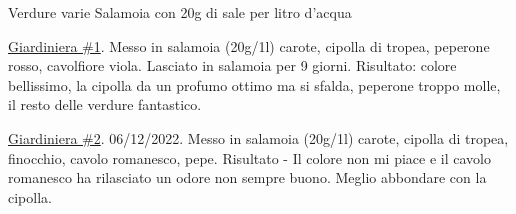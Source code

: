 \cooktime[]{-}%
\begin{ingreds}
	Verdure varie
	Salamoia con 20g di sale per litro d'acqua



\end{ingreds}

\begin{method}
\underline{Giardiniera \#1}. Messo in salamoia (20g/1l) carote, cipolla di tropea, peperone rosso, cavolfiore viola. Lasciato in salamoia per 9 giorni. Risultato: colore bellissimo, la cipolla da un profumo ottimo ma si sfalda, peperone troppo molle, il resto delle verdure fantastico.

\underline{Giardiniera \#2}. 06/12/2022. Messo in salamoia (20g/1l) carote, cipolla di tropea, finocchio, cavolo romanesco, pepe. Risultato - Il colore non mi piace e il cavolo romanesco ha rilasciato un odore non sempre buono. Meglio abbondare con la cipolla.



\end{method}




